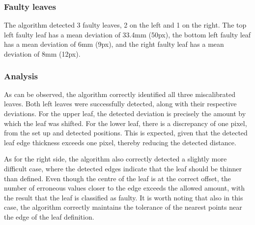 \subsubsection{Faulty leaves}

The algorithm detected 3 faulty leaves, 2 on the left and 1 on the right. The top left faulty leaf has a mean deviation of 33.4mm (50px), the bottom left faulty leaf has a mean deviation of 6mm (9px), and the right faulty leaf has a mean deviation of 8mm (12px).

\subsubsection{Analysis}

As can be observed, the algorithm correctly identified all three miscalibrated leaves. Both left leaves were successfully detected, along with their respective deviations. For the upper leaf, the detected deviation is precisely the amount by which the leaf was shifted. For the lower leaf, there is a discrepancy of one pixel, from the set up and detected positions. This is expected, given that the detected leaf edge thickness exceeds one pixel, thereby reducing the detected distance.

As for the right side, the algorithm also correctly detected a slightly more difficult case, where the detected edges indicate that the leaf should be thinner than defined. Even though the centre of the leaf is at the correct offset, the number of erroneous values closer to the edge exceeds the allowed amount, with the result that the leaf is classified as faulty. It is worth noting that also in this case, the algorithm correctly maintains the tolerance of the nearest points near the edge of the leaf definition.
